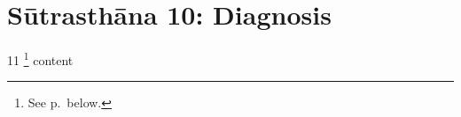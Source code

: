 \chapter{Sūtrasthāna 10: Diagnosis}
\label{kṣārapāka}

\begin{translation}
    
    \item[11]
    \footnote{See p.\,\pageref{kṣārapāka2} below.}
    content
\end{translation}